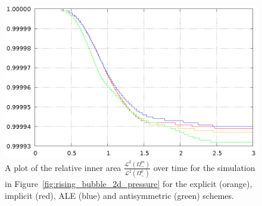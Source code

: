 \begin{figure}[htbp]
\centering
\includegraphics[width=.45\textwidth]
{figures/navier_stokes/2d_rising_bubble_inner_volume.ps}
\caption[Navier--Stokes 2d rising bubble inner area]
{A plot of the relative inner area
$\frac{\mathcal{L}^2(\Omega^m_-)}{\mathcal{L}^2(\Omega^0_-)}$ over time for the
simulation in Figure~\ref{fig:rising_bubble_2d_pressure} for the explicit
(orange), implicit (red), ALE (blue) and antisymmetric (green) schemes.}
\label{fig:rising_bubble_2d_bulk_inner_volume}
\end{figure}



